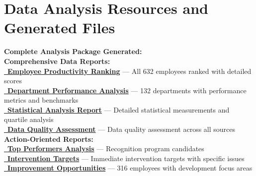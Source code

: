 \documentclass[12pt,a4paper]{article}
\begin{document}
\section{Data Analysis Resources and Generated Files}

\begin{resourcebox}
\textbf{\faDownload \quad Complete Analysis Package Generated:}\\[0.8em]

\textbf{Comprehensive Data Reports:}\\
\textcolor{primaryGold}{\href{https://fixysaskihumorizijuv.supabase.co/storage/v1/object/public/research-files/10c10921-f037-476a-a3e2-443b4f24dacd-complete_employee_productivity_ranking.csv?download=}{{\normalsize\faTrophy}\, \textbf{Employee Productivity Ranking}}} — All 632 employees ranked with detailed scores\\
\textcolor{primaryBlue}{\href{https://fixysaskihumorizijuv.supabase.co/storage/v1/object/public/research-files/c063886e-6e70-476c-b87d-de0dc3c0f2b9-comprehensive_department_analysis.csv?download=}{{\normalsize\faBuilding}\, \textbf{Department Performance Analysis}}} — 132 departments with performance metrics and benchmarks\\
\textcolor{accentBlue}{\href{https://fixysaskihumorizijuv.supabase.co/storage/v1/object/public/research-files/6bc2ed7c-9918-4171-9b19-2d31fb67df5d-advanced_statistical_analysis.csv?download=}{{\normalsize\faChartLine}\, \textbf{Statistical Analysis Report}}} — Detailed statistical measurements and quartile analysis\\
\textcolor{successGreen}{\href{https://fixysaskihumorizijuv.supabase.co/storage/v1/object/public/research-files/28c816b5-f241-4749-80a7-f8e75b78f052-data_completeness_check.csv?download=}{{\normalsize\faShieldAlt}\, \textbf{Data Quality Assessment}}} — Data quality assessment across all sources\\[0.5em]

\textbf{Action-Oriented Reports:}\\
\textcolor{accentGold}{\href{https://fixysaskihumorizijuv.supabase.co/storage/v1/object/public/research-files/d7107b00-7e41-4006-a14b-1bd782f73914-top_50_performers_detailed.csv?download=}{{\normalsize\faMedal}\, \textbf{Top Performers Analysis}}} — Recognition program candidates\\
\textcolor{dangerRed}{\href{https://fixysaskihumorizijuv.supabase.co/storage/v1/object/public/research-files/82454a51-b4a9-4f64-b213-29ce048aad16-bottom_50_performers_detailed.csv?download=}{{\normalsize\faWarning}\, \textbf{Intervention Targets}}} — Immediate intervention targets with specific issues\\
\textcolor{successGreen}{\href{https://fixysaskihumorizijuv.supabase.co/storage/v1/object/public/research-files/03f82764-e85b-4f1f-b127-04cb7347bd2b-improvement_opportunities_detailed.csv?download=}{{\normalsize\faCheckCircle}\, \textbf{Improvement Opportunities}}} — 316 employees with development focus areas\\[0.5em]


\end{resourcebox}
\end{document}
